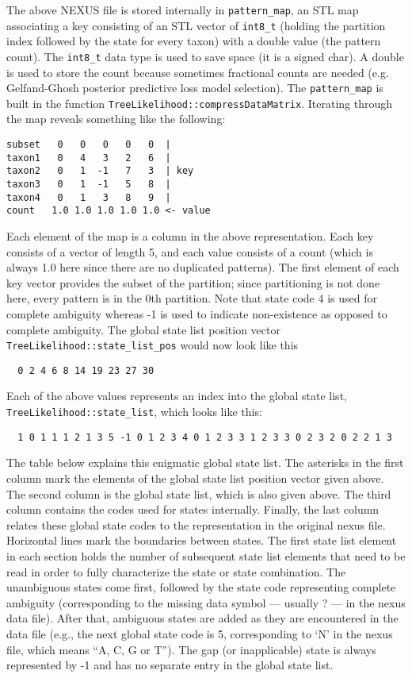 The above NEXUS file is stored internally in {\tt pattern\_map}, an STL map associating a key consisting of an STL vector of {\tt int8\_t} (holding the partition index followed by the state for every taxon) with a double value (the pattern count). The {\tt int8\_t} data type is used to save space (it is a signed char). A double is used to store the count because sometimes fractional counts are needed (e.g. Gelfand-Ghosh posterior predictive loss model selection). The {\tt pattern\_map} is built in the function {\tt TreeLikelihood::compressDataMatrix}. Iterating through the map reveals something like the following:
\begin{verbatim}
subset   0   0   0   0   0  |
taxon1   0   4   3   2   6  |
taxon2   0   1  -1   7   3  | key
taxon3   0   1  -1   5   8  |
taxon4   0   1   3   8   9  |
count   1.0 1.0 1.0 1.0 1.0 <- value
\end{verbatim}
Each element of the map is a column in the above representation. Each key consists of a vector of length 5, and each value consists of a count (which is always 1.0 here since there are no duplicated patterns). The first element of each key vector provides the subset of the partition; since partitioning is not done here, every pattern is in the 0th partition. Note that state code 4 is used for complete ambiguity whereas -1 is used to indicate non-existence as opposed to complete ambiguity. The global state list position vector {\tt TreeLikelihood::state\_list\_pos} would now look like this 
\begin{verbatim}
  0 2 4 6 8 14 19 23 27 30
\end{verbatim}
Each of the above values represents an index into the global state list, {\tt TreeLikelihood::state\_list}, which looks like this:
\begin{verbatim}
  1 0 1 1 1 2 1 3 5 -1 0 1 2 3 4 0 1 2 3 3 1 2 3 3 0 2 3 2 0 2 2 1 3
\end{verbatim}
The table below explains this enigmatic global state list. The asterisks in the first column mark the elements of the global state list position vector given above. The second column is the global state list, which is also given above. The third column contains the codes used for states internally. Finally, the last column relates these global state codes to the representation in the original nexus file. Horizontal lines mark the boundaries between states. The first state list element in each section holds the number of subsequent state list elements that need to be read in order to fully characterize the state or state combination. The unambiguous states come first, followed by the state code representing complete ambiguity (corresponding to the missing data symbol --- usually ? --- in the nexus data file). After that, ambiguous states are added as they are encountered in the data file (e.g., the next global state code is 5, corresponding to `N' in the nexus file, which means ``A, C, G or T''). The gap (or inapplicable) state is always represented by -1 and has no separate entry in the global state list.
